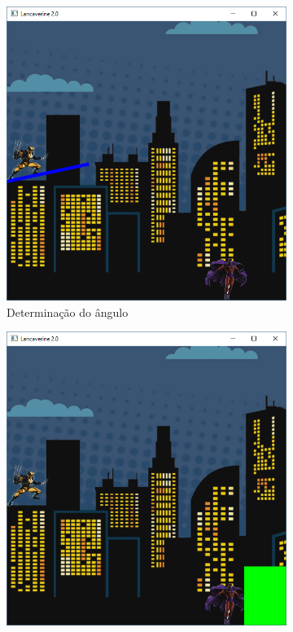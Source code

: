 \begin{enumerate}
   \begin{figure}[!htp]
    \centering
    \begin{subfigure}[t]{0.3\textwidth}
        \centerline{\includegraphics[width=.9\textwidth]{img/cap3_ex27}}
        \caption{Determinação do ângulo}
        \label{fig:cap03_ex27a}
    \end{subfigure}
    \hfill
    \begin{subfigure}[t]{0.3\textwidth}
        \centerline{\includegraphics[width=.9\textwidth]{img/cap3_ex27b}}

\end{subfigure}
\end{figure}
\end{enumerate}
